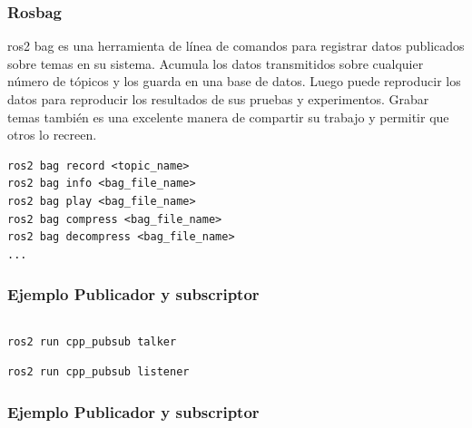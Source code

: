 \begin{frame}[fragile]
	\frametitle{Rosbag}
	ros2 bag es una herramienta de línea de comandos para registrar datos publicados sobre temas en su sistema. Acumula los datos transmitidos sobre cualquier número de tópicos y los guarda en una base de datos. Luego puede reproducir los datos para reproducir los resultados de sus pruebas y experimentos. Grabar temas también es una excelente manera de compartir su trabajo y permitir que otros lo recreen.

\begin{lstlisting}[style=bash] 
ros2 bag record <topic_name>
ros2 bag info <bag_file_name>
ros2 bag play <bag_file_name>
ros2 bag compress <bag_file_name>
ros2 bag decompress <bag_file_name>
...
\end{lstlisting}
	
\end{frame}

\begin{frame}[fragile]
	\frametitle{Ejemplo Publicador y subscriptor}
    
    \begin{columns}
        \begin{column}{0.5\textwidth}
            
        \end{column}
        \begin{column}{0.5\textwidth}
            
        \end{column}
    \end{columns}
	
\begin{lstlisting}[style=bash,basicstyle=\footnotesize] 
ros2 run cpp_pubsub talker
\end{lstlisting}
\begin{lstlisting}[style=bash,basicstyle=\footnotesize] 
ros2 run cpp_pubsub listener
\end{lstlisting}
	
\end{frame}

\begin{frame}[fragile]
    \frametitle{Ejemplo Publicador y subscriptor}
    
    \begin{columns}
        \begin{column}{0.5\textwidth}
            
        \end{column}
        \begin{column}{0.5\textwidth}
            
        \end{column}
    \end{columns}
    
\end{frame}

